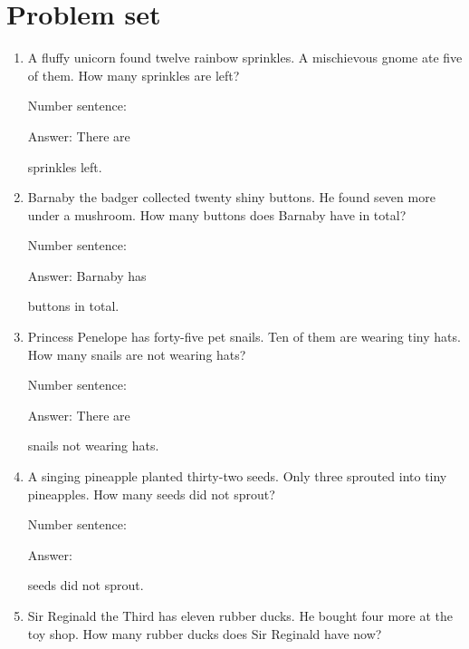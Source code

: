 \documentclass{tufte-book}
\begin{document}
\clearpage\section{Problem set }

\begin{enumerate}

\item
  A fluffy unicorn found twelve rainbow sprinkles. A mischievous gnome
  ate five of them. How many sprinkles are left?\medskip\par
  Number sentence:
  \dotfill\medskip\par
  Answer: There are
  \dotfill\medskip\par\mbox{}\dotfill\medskip\par\mbox{}\dotfill\bigskip
  sprinkles left.
\item
  Barnaby the badger collected twenty shiny buttons. He found seven more
  under a mushroom. How many buttons does Barnaby have in total?\medskip\par
  Number sentence:
  \dotfill\medskip\par
  Answer: Barnaby has
  \dotfill\medskip\par\mbox{}\dotfill\medskip\par\mbox{}\dotfill\bigskip
  buttons in total.
\item
  Princess Penelope has forty-five pet snails. Ten of them are wearing
  tiny hats. How many snails are not wearing hats?\medskip\par
  Number sentence:
  \dotfill\medskip\par
  Answer: There are
  \dotfill\medskip\par\mbox{}\dotfill\medskip\par\mbox{}\dotfill\bigskip
  snails not wearing hats.
\item
  A singing pineapple planted thirty-two seeds. Only three sprouted into
  tiny pineapples. How many seeds did not sprout?\medskip\par
  Number sentence:
  \dotfill\medskip\par
  Answer:
  \dotfill\medskip\par\mbox{}\dotfill\medskip\par\mbox{}\dotfill\bigskip
  seeds did not sprout.
\item
  Sir Reginald the Third has eleven rubber ducks. He bought four more at
  the toy shop. How many rubber ducks does Sir Reginald have now?\medskip\par

\end{enumerate}
\end{document}
